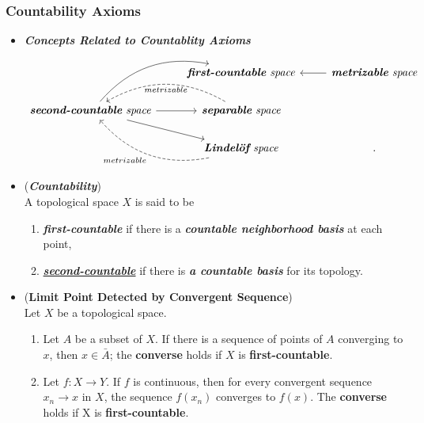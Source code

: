 \documentclass[11pt]{article}
\begin{document}
\subsubsection{Countability Axioms}
\begin{itemize}
\item \emph{\textbf{Concepts Related to Countablity Axioms}}
\[
  \begin{tikzcd}
     &  \text{\emph{\textbf{first-countable} space}} &\arrow{l}{} \text{\emph{\textbf{metrizable} space}}\\
   \text{\emph{\textbf{second-countable} space}}  \arrow[ur, bend left] \arrow{r}{} \arrow[dr]  & \arrow[l, bend right, dashed, "metrizable"] \text{\emph{\textbf{separable} space}} &\\
     &  \arrow[ul, dashed,  bend left,  "metrizable"] \text{\emph{\textbf{Lindel{\"o}f} space}}&.
  \end{tikzcd}
\] 

\item \begin{definition} (\emph{\textbf{Countability}})\\
A topological space $X$ is said to be 
\begin{enumerate}
\item \emph{\textbf{first-countable}} if there is a \emph{\textbf{countable neighborhood basis}} at each point, 
\item \underline{\emph{\textbf{second-countable}}} if there is \emph{\textbf{a countable basis}} for its topology.
\end{enumerate}
\end{definition}

\item \begin{proposition} (\textbf{Limit Point Detected by Convergent Sequence}) \citep{munkres2000topology}\\
Let $X$ be a topological space.
\begin{enumerate}
\item Let $A$ be a subset of $X$. If there is a sequence of points of $A$ converging to $x$, then $x \in \bar{A}$; the \textbf{converse} holds if $X$ is \textbf{first-countable}.
\item Let $f : X \rightarrow Y$. If $f$ is continuous, then for every convergent sequence $x_n \rightarrow x$ in $X$, the sequence $f(x_n)$ converges to $f(x)$. The \textbf{converse} holds if X is \textbf{first-countable}.
\end{enumerate}
\end{proposition}


\end{itemize}
\end{document}
